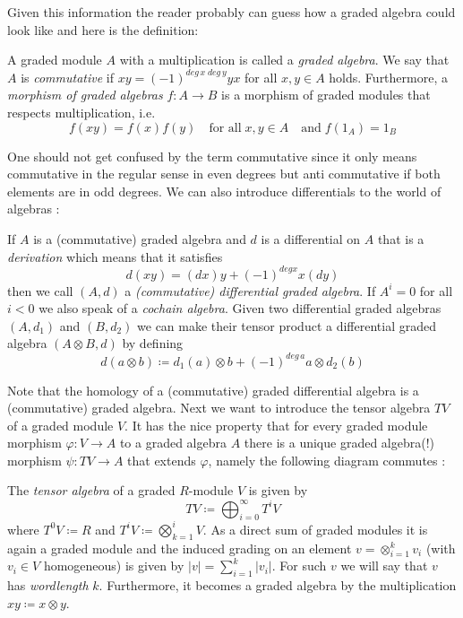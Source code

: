  Given this information the reader probably can guess how a graded algebra could look like and here is the definition:
\begin{Definition}
 A graded module $A$ with a multiplication is called a \emph{graded algebra}. We say that $A$ is \emph{commutative} if
 $xy = (-1)^{deg \, x \; deg \, y} yx$ for all $x,y \in A$ holds. Furthermore, a \emph{morphism of graded algebras} 
 $f \colon A \to B$ is a morphism of graded modules that respects multiplication, i.e. 
 $$f(xy) = f(x)f(y) \quad \text{for all} \; x,y \in A \quad \text{and} \; f(1_A) = 1_B $$
\end{Definition}

One should not get confused by the term commutative since it only means commutative in the regular sense in even degrees but
anti commutative if both elements are in odd degrees.
We can also introduce differentials to the world of algebras :
\begin{Definition}
 If $A$ is a (commutative) graded algebra and $d$ is a differential on $A$ that is a \emph{derivation} which means
 that it satisfies 
 $$ d(xy) = (dx)y + (-1)^{deg x} x(dy)$$
 then we call $(A,d)$ a \emph{(commutative) differential graded algebra}. If $A^i = 0$ for all $i < 0$ we also
 speak of a \emph{cochain algebra}. \newline
 Given two differential graded algebras $(A,d_1)$ and $(B, d_2)$ we can make their tensor product a 
 differential graded algebra $(A \otimes B, d)$ by defining 
 $$ d(a \otimes b) \coloneqq d_1(a) \otimes b + (-1)^{deg \, a} a \otimes d_2(b)$$
\end{Definition}

Note that the homology of a (commutative) graded differential algebra is a (commutative) graded algebra. \newline
Next we want to introduce the tensor algebra $TV$ of a graded module $V$. It has the nice property
that for every graded module morphism $\varphi \colon V \to A$ to a graded algebra $A$ there is a unique 
graded algebra(!) morphism $\psi \colon TV \to A$ that extends $\varphi$, namely the following diagram commutes :

\centerline{ 
}

\begin{Definition}
 The \emph{tensor algebra} of a graded $R$-module $V$ is given by
 $$ TV \coloneqq \bigoplus_{i = 0}^\infty T^i V$$
 where $T^0 V \coloneqq R$ and $T^i V \coloneqq \bigotimes_{k=1}^i V$. \newline
 As a direct sum of graded modules it is again a graded module and the induced grading on an element
 $ v = \otimes_{i = 1}^k v_i $ (with $v_i \in V$ homogeneous) is given by $ |v| = \sum_{ i = 1}^k |v_i|$.
 For such $v$ we will say that $v$ has \emph{wordlength} $k$.
 Furthermore, it becomes a graded algebra by the multiplication $xy \coloneqq x \otimes y$.
\end{Definition}

